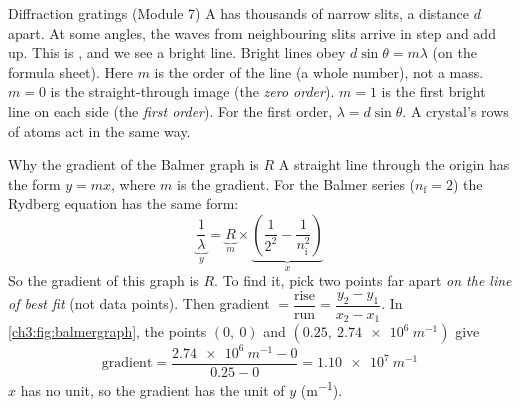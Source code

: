 \begin{refresher}{Diffraction gratings (Module 7)}
A  has thousands of narrow slits, a distance $d$ apart. At some
angles, the waves from neighbouring slits arrive in step and add up. This is
, and we see a bright line. Bright lines obey
$d\sin\theta = m\lambda$ (on the formula sheet). Here $m$ is the order of the line (a whole
number), not a mass. $m = 0$ is the straight-through image (the \emph{zero order}). $m = 1$ is the first bright line on each side (the \emph{first order}).
For the first order, $\lambda = d\sin\theta$. A crystal's rows of atoms act in the same way.
\end{refresher}

\begin{toolkit}{Why the gradient of the Balmer graph is $R$}
A straight line through the origin has the form $y = mx$, where $m$ is the gradient. For the
Balmer series ($n_\mathrm{f} = 2$) the Rydberg equation has the same form:
\[ \underbrace{\frac{1}{\lambda}}_{y} = \underbrace{R}_{m} \times
   \underbrace{\left(\frac{1}{2^2} - \frac{1}{n_\mathrm{i}^2}\right)}_{x} \]
So the gradient of this graph is $R$. To find it, pick two points far apart \emph{on the line
of best fit} (not data points). Then gradient $= \dfrac{\text{rise}}{\text{run}} =
\dfrac{y_2 - y_1}{x_2 - x_1}$. In \cref{ch3:fig:balmergraph}, the points $(0,\ 0)$ and $(0.25,\ \qty{2.74e6}{m^{-1}})$ give
\[ \text{gradient} = \frac{\qty{2.74e6}{m^{-1}} - 0}{0.25 - 0} = \qty{1.10e7}{m^{-1}} \]
$x$ has no unit, so the gradient has the unit of $y$ (\si{m^{-1}}).
\end{toolkit}

